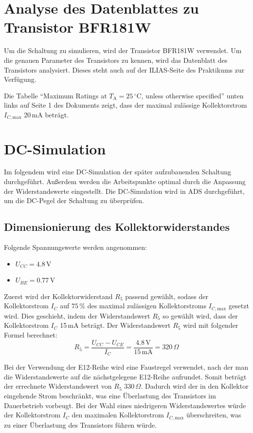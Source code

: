 \section{Analyse des Datenblattes zu Transistor BFR181W}
Um die Schaltung zu simulieren, wird der Transistor BFR181W verwendet. Um die genauen Parameter des Transistors zu kennen, wird das Datenblatt des Transistors analysiert.
Dieses steht auch auf der ILIAS-Seite des Praktikums zur Verfügung.

Die Tabelle \enquote{Maximum Ratings at $T_\mathrm{A}=25\,^\circ\mathrm{C}$, unless otherwise specified} unten links auf Seite 1 des Dokuments zeigt, dass der maximal zulässige Kollektorstrom $I_{C,\mathrm{max}}$ 20\,mA beträgt.
\section{DC-Simulation}
Im folgendem wird eine DC-Simulation der später aufzubauenden Schaltung durchgeführt. 
Außerdem werden die Arbeitspunkte optimal durch die Anpassung der Widerstandswerte eingestellt.
Die DC-Simulation wird in \ac{ADS} durchgeführt, um die DC-Pegel der Schaltung zu überprüfen.
\clearpage
\subsection{Dimensionierung des Kollektorwiderstandes}
Folgende Spannungswerte werden angenommen:
\begin{itemize}
    \item $U_{CC} = 4.8\,\mathrm{V}$
    \item $U_{BE} = 0.77\,\mathrm{V}$
\end{itemize}

Zuerst wird der Kollektorwiderstand $R_5$ passend gewählt, sodass der Kollektorstrom $I_C$ auf $75\,\%$ des maximal zulässigen Kollektorstroms $I_{C,\mathrm{max}}$ gesetzt wird. 
Dies geschieht, indem der Widerstandswert $R_5$ so gewählt wird, dass der Kollektorstrom $I_C$ 15\,mA beträgt.
Der Widerstandswert $R_5$ wird mit folgender Formel berechnet:
\begin{equation}
    R_5 = \frac{U_{CC} - U_{CE}}{I_C} = \frac{4.8\,\mathrm{V}}{15\,\mathrm{mA}} = 320\,\Omega
\end{equation}

Bei der Verwendung der E12-Reihe wird eine Faustregel verwendet, nach der man die Widerstandswerte auf die nächstgelegene E12-Reihe aufrundet. 
Somit beträgt der errechnete Widerstandswert von $R_5$ 330\,\(\Omega\). Dadurch wird der in den Kollektor eingehende Strom beschränkt, was eine Überlastung des Transistors im Dauerbetrieb vorbeugt. Bei der Wahl eines niedrigeren Widerstandswertes würde der Kollektorstrom $I_C$ den maximalen Kollektorstrom $I_{C,\mathrm{max}}$ überschreiten, was zu einer Überlastung des Transistors führen würde.

